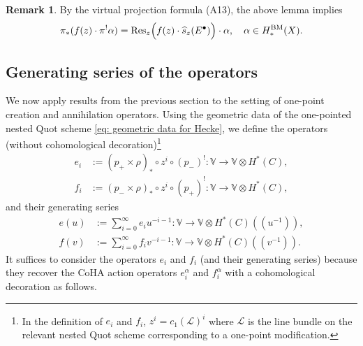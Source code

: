 \documentclass[10pt]{amsart}
\newcommand{\BV}{\mathbb{V}}
\newcommand{\CL}{\mathcal{L}}
\newcommand{\BM}{\textnormal{BM}}
\newcommand{\+}{{}^+}
\newcommand{\Res}{\textnormal{Res}}
\theoremstyle{definition}
\theoremstyle {definition}
\newtheorem{remark}[theorem]{Remark}
\theoremstyle {definition}
\begin{document}
\begin{remark}
    By the virtual projection formula (A13), the above lemma implies
    $$\pi_*(f(z)\cdot \pi^!\alpha)=\Res_z\Big(f(z)\cdot \widehat{s}_z(E^\bullet)\Big)\cdot \alpha,\quad \alpha\in H^{\BM}_*(X).
    $$
\end{remark}




\subsection{Generating series of the operators}\label{sec: generating series}

We now apply results from the previous section to the setting of one-point creation and annihilation operators. Using the geometric data of the one-pointed nested Quot scheme \eqref{eq: geometric data for Hecke}, we define the operators (without cohomological decoration)\footnote{In the definition of $e_i$ and $f_i$, $z^i=c_1(\CL)^i$ where $\CL$ is the line bundle on the relevant nested Quot scheme corresponding to a one-point modification. } 
\begin{align}
e_i&:=(p_+\times \rho)_*\circ z^i\circ (p_-)^!:\BV\rightarrow \BV\otimes H^*(C),\label{eaction}\\
f_i&:=(p_-\times \rho)_*\circ z^i\circ (p_+)^!:\BV\rightarrow \BV\otimes H^*(C) \label{faction},
\end{align} 
and their generating series
\begin{align*}
e(u)&:=\sum_{i=0}^\infty e_i u^{-i-1}:\BV\rightarrow \BV\otimes H^*(C)(\!(u^{-1})\!),\\
f(v)&:=\sum_{i=0}^\infty f_i v^{-i-1}:\BV\rightarrow \BV\otimes H^*(C)(\!(v^{-1})\!).
\end{align*}
It suffices to consider the operators $e_i$ and $f_i$ (and their generating series) because they recover the CoHA action operators $e_i^\alpha$ and $f_i^\alpha$ with a cohomological decoration as follows.
\end{document}
